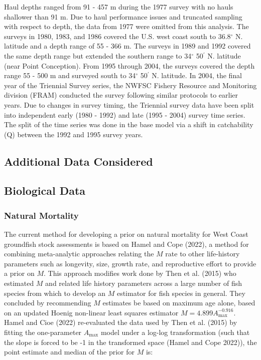 \documentclass[
]{scrartcl}
\begin{document}
Haul depths ranged from 91 - 457 m during the 1977 survey with no hauls
shallower than 91 m. Due to haul performance issues and truncated
sampling with respect to depth, the data from 1977 were omitted from
this analysis. The surveys in 1980, 1983, and 1986 covered the U.S. west
coast south to 36.8\(^\circ\) N. latitude and a depth range of 55 - 366
m. The surveys in 1989 and 1992 covered the same depth range but
extended the southern range to 34\(^\circ\) 50\(^\prime\) N. latitude
(near Point Conception). From 1995 through 2004, the surveys covered the
depth range 55 - 500 m and surveyed south to 34\(^\circ\) 50\(^\prime\)
N. latitude. In 2004, the final year of the Triennial Survey series, the
NWFSC Fishery Resource and Monitoring division (FRAM) conducted the
survey following similar protocols to earlier years. Due to changes in
survey timing, the Triennial survey data have been split into
independent early (1980 - 1992) and late (1995 - 2004) survey time
series. The split of the time series was done in the base model via a
shift in catchability (Q) between the 1992 and 1995 survey years.

\subsection{Additional Data
Considered}\label{additional-data-considered}

\subsection{Biological Data}\label{biological-data}

\subsubsection{Natural Mortality}\label{natural-mortality}

The current method for developing a prior on natural mortality for West
Coast groundfish stock assessments is based on Hamel and Cope (2022), a
method for combining meta-analytic approaches relating the \(M\) rate to
other life-history parameters such as longevity, size, growth rate, and
reproductive effort to provide a prior on \(M\). This approach modifies
work done by Then et al. (2015) who estimated \(M\) and related life
history parameters across a large number of fish species from which to
develop an \(M\) estimator for fish species in general. They concluded
by recommending \(M\) estimates be based on maximum age alone, based on
an updated Hoenig non-linear least squares estimator
\(M = 4.899A^{-0.916}_{\text{max}}\). Hamel and Cioe (2022) re-evaluated
the data used by Then et al. (2015) by fitting the one-parameter
\(A_{\text{max}}\) model under a log-log transformation (such that the
slope is forced to be -1 in the transformed space (Hamel and Cope
2022)), the point estimate and median of the prior for \(M\) is:
\end{document}
